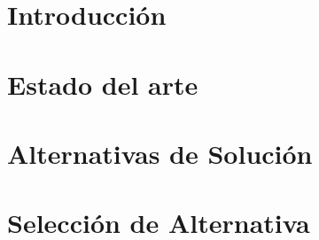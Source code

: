 \documentclass[11pt,letterpaper,oneside]{phstylee}
\begin{document}
\chapter{Introducción}
\label{cap:introduccion}


\newpage
\thispagestyle{empty}
\cleardoublepage

\chapter{Estado del arte}
\label{cap:art}


\newpage
\thispagestyle{empty}
\cleardoublepage

\chapter{Alternativas de Solución}
\label{cap:alternatives}


\newpage
\thispagestyle{empty}
\cleardoublepage

\chapter{Selección de Alternativa}
\label{cap:selection}


\newpage
\thispagestyle{empty}
\cleardoublepage
\end{document}
